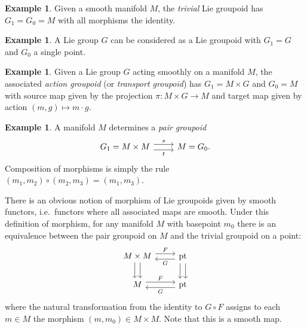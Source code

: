 \documentclass{article}
\newtheorem{proposed work}[theorem]{Proposed Work}
\theoremstyle{definition}
\newtheorem{examplenonit}[theorem]{Example}
\begin{document}
\begin{examplenonit}
  Given a smooth manifold $M$, the {\em trivial} Lie groupoid has $G_1
  = G_0 = M$ with all morphisms the identity.
\end{examplenonit}

\begin{examplenonit}
  A Lie group $G$ can be considered as a Lie groupoid with $G_1 = G$
  and $G_0$ a single point.
\end{examplenonit}

\begin{examplenonit}
  Given a Lie group $G$ acting smoothly on a manifold $M$, the
  associated {\em action groupoid} (or {\em transport groupoid}) has
  $G_1 = M\times G$ and $G_0 = M$ with source map given by the
  projection $\pi : M\times G \to M$ and target map given by action
  $(m, g) \mapsto m\cdot g$.
\end{examplenonit}

\begin{examplenonit}
  A manifold $M$ determines a {\em pair groupoid} 
  \[
  \begin{tikzcd}
    G_1 = M\times M \ar[r,shift left=.75ex,"s"]
    \ar[r,shift right=.75ex,swap,"t"]
    &
    M = G_0.
  \end{tikzcd}
  \]
  Composition of morphisms is simply the rule $(m_1, m_2) \circ (m_2, m_3) =
  (m_1, m_3)$.
\end{examplenonit}


There is an obvious notion of morphism of Lie groupoids given by
smooth functors, i.e.\ functors where all associated maps are smooth.
Under this definition of morphism, for any manifold $M$ with basepoint
$m_0$ there is an equivalence between the pair groupoid on $M$ and the
trivial groupoid on a point:
\[
  \begin{tikzcd}
    M\times M \ar[d,shift left=.75ex]
    \ar[d,shift right=.75ex]
    \ar[r,shift left=.75ex,"F"]
    &
    \text{pt}
    \ar[d,shift left=.75ex]
    \ar[d,shift right=.75ex]
    \ar[l,shift left=.75ex,"G"]
    \\
    M
    \ar[r,shift left=.75ex,"F"]
    &
    \text{pt}
    \ar[l,shift left=.75ex,"G"]
  \end{tikzcd}
\]
where the natural transformation from the identity to $G \circ F$
assigns to each $m\in M$ the morphism $(m,m_0)\in M\times M$. Note
that this is a smooth map.
\end{document}
